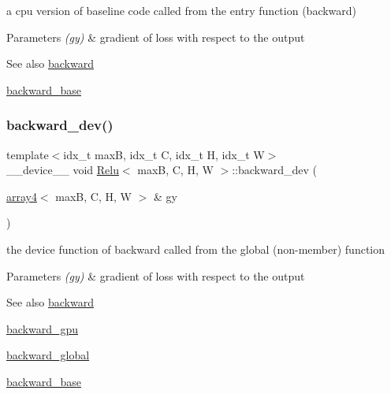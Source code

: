 a cpu version of baseline code called from the entry function (backward) 


\begin{DoxyParams}{Parameters}
{\em (gy)} & gradient of loss with respect to the output \\
\hline
\end{DoxyParams}
\begin{DoxySeeAlso}{See also}
\hyperlink{structRelu_af9d3182c5103542c1c9796edc449847c}{backward} 

\hyperlink{structRelu_ad2da72c21984db8c9cec57c6d60bf741}{backward\+\_\+base} 
\end{DoxySeeAlso}
\mbox{\label{structRelu_a0b13992d8093aa08ed9036cac3a5437b}} 
\subsubsection{\texorpdfstring{backward\+\_\+dev()}{backward\_dev()}}
{\footnotesize\ttfamily template$<$idx\+\_\+t maxB, idx\+\_\+t C, idx\+\_\+t H, idx\+\_\+t W$>$ \\
\+\_\+\+\_\+device\+\_\+\+\_\+ void \hyperlink{structRelu}{Relu}$<$ maxB, C, H, W $>$\+::backward\+\_\+dev (\begin{DoxyParamCaption}\item[{\hyperlink{structarray4}{array4}$<$ maxB, C, H, W $>$ \&}]{gy }\end{DoxyParamCaption})\hspace{0.3cm}{\ttfamily [inline]}}



the device function of backward called from the global (non-\/member) function 


\begin{DoxyParams}{Parameters}
{\em (gy)} & gradient of loss with respect to the output \\
\hline
\end{DoxyParams}
\begin{DoxySeeAlso}{See also}
\hyperlink{structRelu_af9d3182c5103542c1c9796edc449847c}{backward} 

\hyperlink{structRelu_a15ee109a34e8ad3c94c0b42c05647342}{backward\+\_\+gpu} 

\hyperlink{softmaxcrossentropy_8h_a47d56a9a23e08247b227f4aac17413e0}{backward\+\_\+global} 

\hyperlink{structRelu_ad2da72c21984db8c9cec57c6d60bf741}{backward\+\_\+base} 
\end{DoxySeeAlso}
\mbox{\label{structRelu_a15ee109a34e8ad3c94c0b42c05647342}} 
